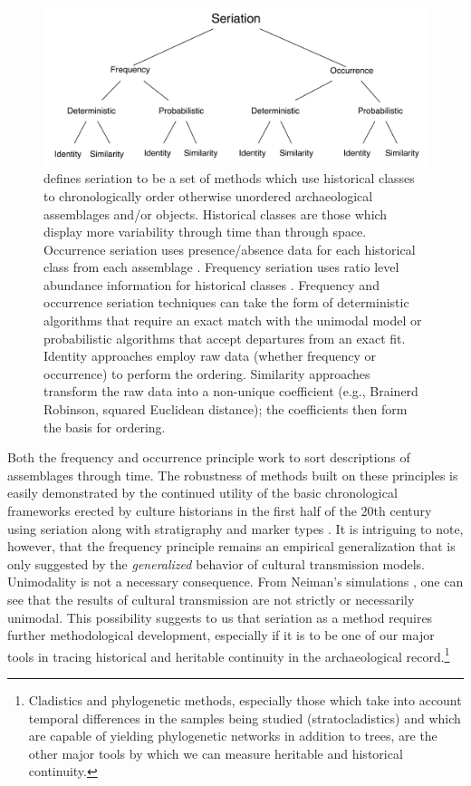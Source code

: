 \begin{figure}[ht]
\centering
\includegraphics[scale=0.6]{graphics/multipleseriation/seriation-methods.pdf}
\caption{\citet{Dunnell1981} defines seriation to be a set of methods which use historical classes to chronologically order otherwise unordered archaeological assemblages and/or objects. Historical classes are those which display more variability through time than through space. Occurrence seriation uses presence/absence data for each historical class from each assemblage \citep{Kroeber1916,Petrie:1899aa}. Frequency seriation uses ratio level abundance information for historical classes \citep{Spier1917,Ford1935a,Ford:1962aa}. Frequency and occurrence seriation techniques can take the form of deterministic algorithms that require an exact match with the unimodal model or probabilistic algorithms that accept departures from an exact fit. Identity approaches employ raw data (whether frequency or occurrence) to perform the ordering. Similarity approaches transform the raw data into a non-unique coefficient (e.g., Brainerd Robinson, squared Euclidean distance); the coefficients then form the basis for ordering.}
\label{multser:img:seriation-methods}
\end{figure}

Both the frequency and occurrence principle work to sort descriptions of
assemblages through time. The robustness of methods built on these
principles is easily demonstrated by the continued utility of the basic
chronological frameworks erected by culture historians in the first half
of the 20th century using seriation along with stratigraphy and marker
types \citep{lyman1997rise}. It is intriguing to note, however, that the
frequency principle remains an empirical generalization that is only
suggested by the \emph{generalized} behavior of cultural transmission models.  Unimodality is not a necessary consequence. 
From Neiman's simulations
\citep[i.e.,][]{Neiman1995}, one can see that the results of cultural
transmission are not strictly or necessarily unimodal. This possibility
suggests to us that seriation as a method requires further
methodological development, especially if it is to be one of our major
tools in tracing historical and heritable continuity in the
archaeological record.\footnote{Cladistics and phylogenetic methods,
  especially those which take into account temporal differences in the
  samples being studied (stratocladistics) and which are capable of
  yielding phylogenetic networks in addition to trees, are the other
  major tools by which we can measure heritable and historical
  continuity.}

